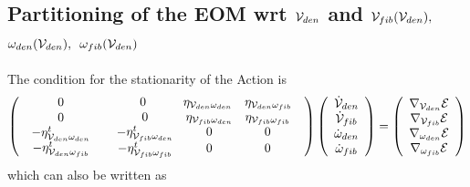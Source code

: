 \subsection{Partitioning of the EOM wrt ${\cal V}_{den}$ and ${\cal V}_{fib}(%
{\cal V}_{den}),$ $\protect\omega _{den}({\cal V}_{den}),$ $\protect\omega %
_{fib}({\cal V}_{den})$}

The condition for the stationarity of the Action is 
\begin{equation}
\left( 
\begin{array}{cc}
0 & 
\begin{array}{ccc}
\qquad 0\qquad & \eta _{{\cal V}_{den}\omega _{den}} & \eta _{{\cal V}%
_{den}\omega _{fib}}%
\end{array}
\\ 
\begin{array}{c}
0 \\ 
-\eta _{{\cal V}_{den}\omega _{den}}^{t} \\ 
-\eta _{{\cal V}_{den}\omega _{fib}}^{t}%
\end{array}
& 
\begin{array}{ccc}
0 & \eta _{{\cal V}_{fib}\omega _{den}} & \eta _{{\cal V}_{fib}\omega _{fib}}
\\ 
-\eta _{{\cal V}_{fib}\omega _{den}}^{t} & 0 & 0 \\ 
-\eta _{{\cal V}_{fib}\omega _{fib}}^{t} & 0 & 0%
\end{array}%
\end{array}%
\right) \left( 
\begin{array}{c}
{\cal \dot{V}}_{den} \\ 
{\cal \dot{V}}_{fib} \\ 
\dot{\omega}_{den} \\ 
\dot{\omega}_{fib}%
\end{array}%
\right) =\left( 
\begin{array}{c}
\nabla _{{\cal V}_{den}}{\cal E} \\ 
\nabla _{{\cal V}_{fib}}{\cal E} \\ 
\nabla _{\omega _{den}}{\cal E} \\ 
\nabla _{\omega _{fib}}{\cal E}%
\end{array}%
\right)
\end{equation}%
which can also be written as 
